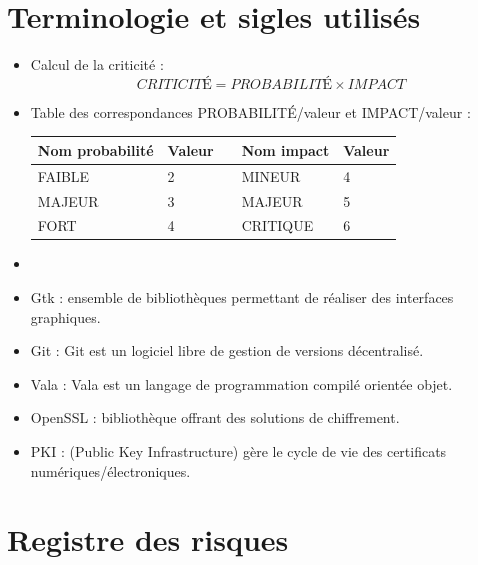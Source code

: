 \documentclass[a4paper,11pt,french]{article}
\begin{document}
\section{Terminologie et sigles utilisés}
\begin{itemize}
\item Calcul de la criticité :\\
$$ CRITICITÉ = PROBABILITÉ \times IMPACT $$
\item Table des correspondances PROBABILITÉ/valeur et IMPACT/valeur :

\begin{center}
\begin{tabular}{|l|l|c|l|l|}
\hline
\textbf{Nom probabilité}&\textbf{Valeur}&&\textbf{Nom impact}&\textbf{Valeur}\\
\hline
FAIBLE&2&&MINEUR&4\\
\hline
MAJEUR&3&&MAJEUR&5\\
\hline
FORT&4&&CRITIQUE&6\\
\hline
\end{tabular}
\end{center}
\item []
\item Gtk : ensemble de bibliothèques permettant de réaliser des interfaces graphiques.
\item Git : Git est un logiciel libre de gestion de versions décentralisé.
\item Vala : Vala est un langage de programmation compilé orientée objet.
\item OpenSSL : bibliothèque offrant des solutions de chiffrement.
\item PKI : (Public Key Infrastructure) gère le cycle de vie des certificats numériques/électroniques.
\end{itemize}
\section{Registre des risques}
\end{document}
